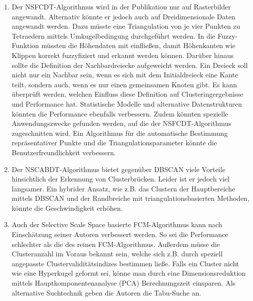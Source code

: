 \documentclass[11pt,ceqn]{book}
\begin{document}
\begin{enumerate}
\item Der NSFCDT-Algorithmus wird in der Publikation nur auf Rasterbilder angewandt. Alternativ könnte er jedoch auch auf Dreidimensionale Daten angewandt werden. Dazu müsste eine Triangulation von je vier Punkten zu Tetraedern mittels Umkugelbedingung durchgeführt werden. In die Fuzzy-Funktion müssten die Höhendaten mit einfließen, damit Höhenkanten wie Klippen korrekt fuzzyfiziert und erkannt werden können. Darüber hinaus sollte die Definition der Nachbardreiecke aufgeweicht werden. Ein Dreieck soll nicht nur ein Nachbar sein, wenn es sich mit dem Initialdreieck eine Kante teilt, sondern auch, wenn es nur einen gemeinsamen Knoten gibt. Es kann überprüft werden, welchen Einfluss diese Definition auf Clusteringergebnisse und Performance hat. Statistische Modelle und alternative Datenstrukturen könnten die Performance ebenfalls verbessern. Zudem könnten spezielle Anwendungszwecke gefunden werden, auf die der NSFCDT-Algorithmus zugeschnitten wird. Ein Algorithmus für die automatische Bestimmung repräsentativer Punkte und die Triangulationsparameter könnte die Benutzerfreundlichkeit verbessern.
\newpage
\item Der NSCABDT-Algorithmus bietet gegenüber DBSCAN viele Vorteile hinsichtlich der Erkennung von Clusterbrücken. Leider ist er jedoch viel langsamer. Ein hybrider Ansatz, wie z.B. das Clustern der Hauptbereiche mittels DBSCAN und der Randbreiche mit triangulationsbasierten Methoden, könnte die Geschwindigkeit erhöhen.
\item Auch der Selective Scale Space basierte FCM-Algorithmus kann nach Einschätzung seiner Autoren verbessert werden. So sei die Performance schlechter als die des reinen FCM-Algorithmus. Außerdem müsse die Clusteranzahl im Voraus bekannt sein, welche sich z.B. durch speziell angepasste Clustervaliditätsindizes bestimmen ließe. Falls ein Cluster nicht wie eine Hyperkugel geformt sei, könne man durch eine Dimensionsreduktion mittels Hauptkomponentenanalyse (PCA) Berechnungszeit einsparen. Als alternative Suchtechnik geben die Autoren die Tabu-Suche an.

\end{enumerate}

\printbibliography

\renewcommand\appendixname{Anhang}
\renewcommand\appendixpagename{Anhang}
\appendixpage
\begin{appendices}



\end{appendices}
\end{document}
